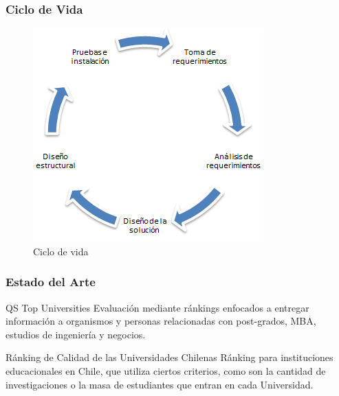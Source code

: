 \documentclass{beamer}
\begin{document}
\begin{frame}
\frametitle{Ciclo de Vida}
\begin{figure}[!hbp]
\begin{center}
\includegraphics[scale=0.6,angle=0]{images/cicloMini.PNG}
\caption{Ciclo de vida}
\label{Organigrama de rectoria}
\end{center}
\end{figure}
\end{frame}


\begin{frame}
\frametitle{Estado del Arte}
\begin{block}{QS Top Universities}
Evaluación mediante ránkings enfocados a entregar información a organismos y personas relacionadas con post-grados, MBA, estudios de ingeniería y negocios.
\end{block}
\begin{block}{Ránking de Calidad de las Universidades Chilenas}
Ránking para instituciones educacionales en Chile, que utiliza ciertos criterios, como son la cantidad de investigaciones o la masa de estudiantes que entran en cada Universidad.
\end{block}
\end{frame}

\end{document}
